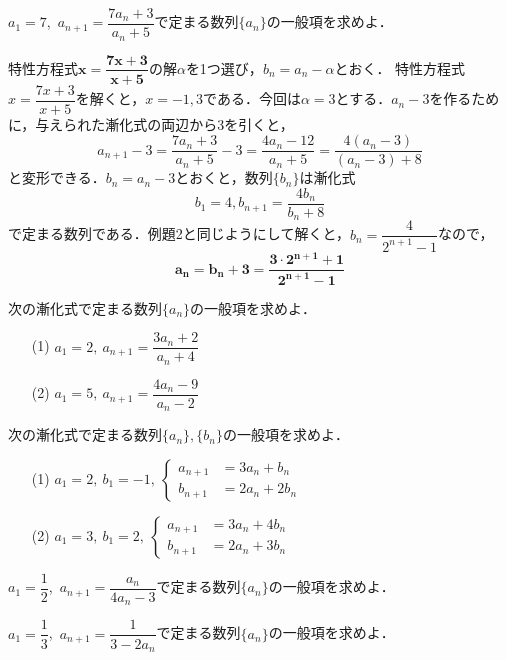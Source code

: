 \documentclass[a4paper,11pt]{ltjsarticle}
\begin{document}
\begin{exque}
     $a_1=7$,~$a_{n+1}=\dfrac{7a_n+3}{a_n+5}$で定まる数列$\{a_n\}$の一般項を求めよ．
\end{exque}
特性方程式$\boldsymbol{x=\dfrac{7x+3}{x+5}}$の解$\alpha$を1つ選び，$b_n=a_n-\alpha$とおく．
\ans 
特性方程式$x=\dfrac{7x+3}{x+5}$を解くと，$x=-1,3$である．今回は$\alpha=3$とする．$a_n-3$を作るために，与えられた漸化式の両辺から3を引くと，
\[a_{n+1}-3=\dfrac{7a_n+3}{a_n+5}-3=\dfrac{4a_n-12}{a_n+5}=\frac{4(a_n-3)}{(a_n-3)+8}\]
と変形できる．$b_n=a_n-3$とおくと，数列$\{b_n\}$は漸化式
\[b_1=4,b_{n+1}=\frac{4b_n}{b_n+8}\]
で定まる数列である．例題2と同じようにして解くと，$b_n=\dfrac{4}{2^{n+1}-1}$なので，
\[\boldsymbol{a_n=b_n+3=\frac{3\cdot 2^{n+1}+1}{2^{n+1}-1}}\]
\begin{toi}
次の漸化式で定まる数列$\{a_n\}$の一般項を求めよ．\\[5pt]
\begin{minipage}{0.5\linewidth}
\begin{itemize}
    \item [(1)]$a_1=2,~a_{n+1}=\dfrac{3a_n+2}{a_n+4}$
\end{itemize}
\end{minipage}
\begin{minipage}{0.5\linewidth}
\begin{itemize}
    \item [(2)]$a_1=5,~a_{n+1}=\dfrac{4a_n-9}{a_n-2}$
\end{itemize}
\end{minipage}
\end{toi}
\newpage
{}
\begin{toi}
    次の漸化式で定まる数列$\{a_n\},\{b_n\}$の一般項を求めよ．\\[5pt]
    \begin{minipage}{0.5\linewidth}
        \begin{itemize}
            \item [(1)]$\displaystyle{a_1=2,~b_1=-1,~\begin{cases}
      a_{n+1}&=3a_n+b_n\\
      b_{n+1}&=2a_n+2b_n
   \end{cases}}$   
        \end{itemize}
    \end{minipage}
    \begin{minipage}{0.5\linewidth}
         \begin{itemize}
            \item [(2)]$\displaystyle{a_1=3,~b_1=2,~\begin{cases}
      a_{n+1}&=3a_n+4b_n\\
      b_{n+1}&=2a_n+3b_n
   \end{cases}}$   
        \end{itemize}
    \end{minipage}
\end{toi}
\begin{toi}
  $a_1=\dfrac12$,~$a_{n+1}=\dfrac{a_n}{4a_n-3}$で定まる数列$\{a_n\}$の一般項を求めよ．
\end{toi}
\begin{toi}
  $a_1=\dfrac13$,~$a_{n+1}=\dfrac{1}{3-2a_n}$で定まる数列$\{a_n\}$の一般項を求めよ．
\end{toi}
\end{document}

